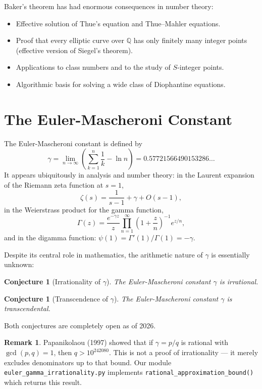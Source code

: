 \documentclass[12pt,a4paper]{amsart}
\newtheorem{conjecture}[theorem]{Conjecture}
\theoremstyle{definition}
\newtheorem{remark}[theorem]{Remark}
\begin{document}
Baker's theorem has had enormous consequences in number theory:
\begin{itemize}[leftmargin=2em]
  \item Effective solution of Thue's equation and Thue--Mahler equations.
  \item Proof that every elliptic curve over $\mathbb{Q}$ has only finitely
        many integer points (effective version of Siegel's theorem).
  \item Applications to class numbers and to the study of $S$-integer points.
  \item Algorithmic basis for solving a wide class of Diophantine equations.
\end{itemize}


\section{The Euler-Mascheroni Constant}
\label{sec:euler-mascheroni}

The Euler-Mascheroni constant is defined by
\[
  \gamma = \lim_{n \to \infty} \left( \sum_{k=1}^n \frac{1}{k} - \ln n \right)
  = 0.57721566490153286\ldots
\]
It appears ubiquitously in analysis and number theory: in the Laurent expansion
of the Riemann zeta function at $s = 1$,
\[
  \zeta(s) = \frac{1}{s-1} + \gamma + O(s-1),
\]
in the Weierstrass product for the gamma function,
\[
  \Gamma(z) = \frac{e^{-\gamma z}}{z} \prod_{n=1}^\infty
  \left(1 + \frac{z}{n}\right)^{-1} e^{z/n},
\]
and in the digamma function: $\psi(1) = \Gamma'(1)/\Gamma(1) = -\gamma$.

Despite its central role in mathematics, the arithmetic nature of $\gamma$ is
essentially unknown:

\begin{conjecture}[Irrationality of $\gamma$]
\label{conj:gamma-irrational}
The Euler-Mascheroni constant $\gamma$ is irrational.
\end{conjecture}

\begin{conjecture}[Transcendence of $\gamma$]
\label{conj:gamma-transcendental}
The Euler-Mascheroni constant $\gamma$ is transcendental.
\end{conjecture}

Both conjectures are completely open as of 2026.

\begin{remark}
Papanikolaou (1997) showed that if $\gamma = p/q$ is rational with
$\gcd(p,q)=1$, then $q > 10^{242080}$. This is not a proof of irrationality —
it merely excludes denominators up to that bound. Our module
\texttt{euler\_gamma\_irrationality.py} implements
\texttt{rational\_approximation\_bound()} which returns this result.
\end{remark}
\end{document}
